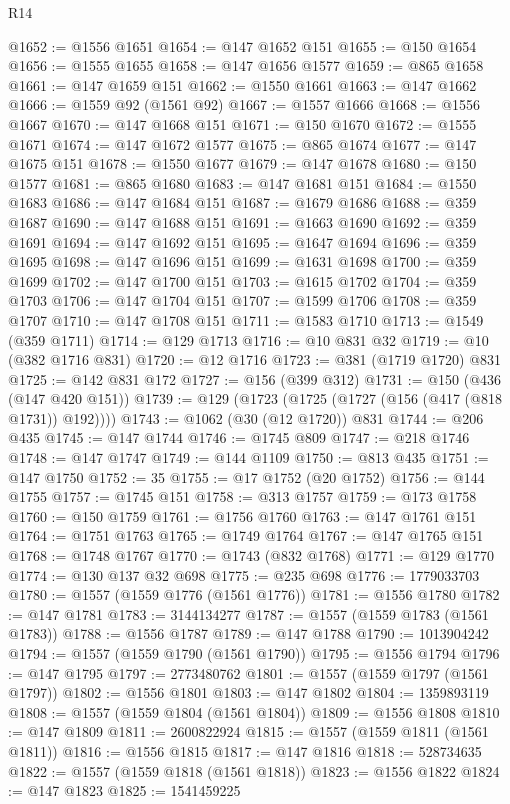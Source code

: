 \begin{lexlean}{R14}
\begin{coremodule}
@1652 := @1556 @1651
@1654 := @147 @1652 @151
@1655 := @150 @1654
@1656 := @1555 @1655
@1658 := @147 @1656 @1577
@1659 := @865 @1658
@1661 := @147 @1659 @151
@1662 := @1550 @1661
@1663 := @147 @1662
@1666 := @1559 @92 (@1561 @92)
@1667 := @1557 @1666
@1668 := @1556 @1667
@1670 := @147 @1668 @151
@1671 := @150 @1670
@1672 := @1555 @1671
@1674 := @147 @1672 @1577
@1675 := @865 @1674
@1677 := @147 @1675 @151
@1678 := @1550 @1677
@1679 := @147 @1678
@1680 := @150 @1577
@1681 := @865 @1680
@1683 := @147 @1681 @151
@1684 := @1550 @1683
@1686 := @147 @1684 @151
@1687 := @1679 @1686
@1688 := @359 @1687
@1690 := @147 @1688 @151
@1691 := @1663 @1690
@1692 := @359 @1691
@1694 := @147 @1692 @151
@1695 := @1647 @1694
@1696 := @359 @1695
@1698 := @147 @1696 @151
@1699 := @1631 @1698
@1700 := @359 @1699
@1702 := @147 @1700 @151
@1703 := @1615 @1702
@1704 := @359 @1703
@1706 := @147 @1704 @151
@1707 := @1599 @1706
@1708 := @359 @1707
@1710 := @147 @1708 @151
@1711 := @1583 @1710
@1713 := @1549 (@359 @1711)
@1714 := @129 @1713
@1716 := @10 @831 @32
@1719 := @10 (@382 @1716 @831)
@1720 := @12 @1716
@1723 := @381 (@1719 @1720) @831
@1725 := @142 @831 @172
@1727 := @156 (@399 @312)
@1731 := @150 (@436 (@147 @420 @151))
@1739 := @129 (@1723 (@1725 (@1727 (@156 (@417 (@818 @1731)) @192))))
@1743 := @1062 (@30 (@12 @1720)) @831
@1744 := @206 @435
@1745 := @147 @1744
@1746 := @1745 @809
@1747 := @218 @1746
@1748 := @147 @1747
@1749 := @144 @1109
@1750 := @813 @435
@1751 := @147 @1750
@1752 := 35
@1755 := @17 @1752 (@20 @1752)
@1756 := @144 @1755
@1757 := @1745 @151
@1758 := @313 @1757
@1759 := @173 @1758
@1760 := @150 @1759
@1761 := @1756 @1760
@1763 := @147 @1761 @151
@1764 := @1751 @1763
@1765 := @1749 @1764
@1767 := @147 @1765 @151
@1768 := @1748 @1767
@1770 := @1743 (@832 @1768)
@1771 := @129 @1770
@1774 := @130 @137 @32 @698
@1775 := @235 @698
@1776 := 1779033703
@1780 := @1557 (@1559 @1776 (@1561 @1776))
@1781 := @1556 @1780
@1782 := @147 @1781
@1783 := 3144134277
@1787 := @1557 (@1559 @1783 (@1561 @1783))
@1788 := @1556 @1787
@1789 := @147 @1788
@1790 := 1013904242
@1794 := @1557 (@1559 @1790 (@1561 @1790))
@1795 := @1556 @1794
@1796 := @147 @1795
@1797 := 2773480762
@1801 := @1557 (@1559 @1797 (@1561 @1797))
@1802 := @1556 @1801
@1803 := @147 @1802
@1804 := 1359893119
@1808 := @1557 (@1559 @1804 (@1561 @1804))
@1809 := @1556 @1808
@1810 := @147 @1809
@1811 := 2600822924
@1815 := @1557 (@1559 @1811 (@1561 @1811))
@1816 := @1556 @1815
@1817 := @147 @1816
@1818 := 528734635
@1822 := @1557 (@1559 @1818 (@1561 @1818))
@1823 := @1556 @1822
@1824 := @147 @1823
@1825 := 1541459225

\end{coremodule}
\end{lexlean}
